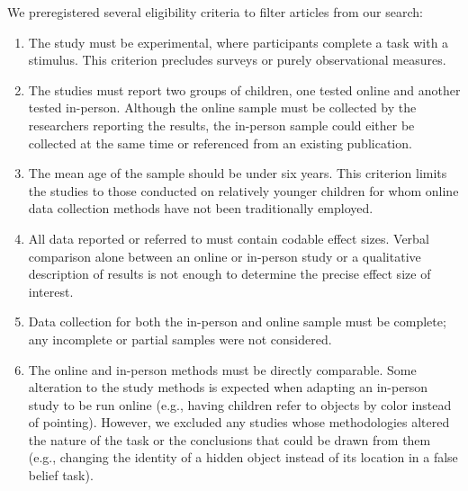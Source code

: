 \documentclass[
  man,floatsintext]{apa6}
\begin{document}
We preregistered several eligibility criteria to filter articles from our search:

\begin{enumerate}
\def\labelenumi{\arabic{enumi}.}
\item
  The study must be experimental, where participants complete a task with a stimulus. This criterion precludes surveys or purely observational measures.
\item
  The studies must report two groups of children, one tested online and another tested in-person. Although the online sample must be collected by the researchers reporting the results, the in-person sample could either be collected at the same time or referenced from an existing publication.
\item
  The mean age of the sample should be under six years. This criterion limits the studies to those conducted on relatively younger children for whom online data collection methods have not been traditionally employed.
\item
  All data reported or referred to must contain codable effect sizes. Verbal comparison alone between an online or in-person study or a qualitative description of results is not enough to determine the precise effect size of interest.
\item
  Data collection for both the in-person and online sample must be complete; any incomplete or partial samples were not considered.
\item
  The online and in-person methods must be directly comparable. Some alteration to the study methods is expected when adapting an in-person study to be run online (e.g., having children refer to objects by color instead of pointing). However, we excluded any studies whose methodologies altered the nature of the task or the conclusions that could be drawn from them (e.g., changing the identity of a hidden object instead of its location in a false belief task).
\end{enumerate}
\end{document}
